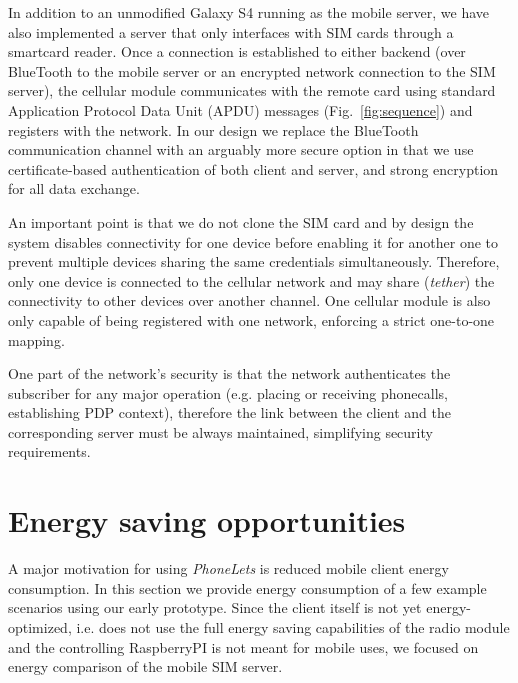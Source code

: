 \documentclass{sig-alternate-10pt}
\begin{document}
In addition to an unmodified Galaxy S4 running as the mobile server, we have also implemented a server that only interfaces with SIM cards through a smartcard reader. Once a connection is established to either backend (over BlueTooth to the mobile server or an encrypted network connection to the SIM server), the cellular module communicates with the remote card using standard Application Protocol Data Unit (APDU) messages (Fig.~\ref{fig:sequence}) and registers with the network. In our design we replace the BlueTooth communication channel with an arguably more secure option in that we use certificate-based authentication of both client and server, and strong encryption for all data exchange.

An important point is that we do not clone the SIM card and by design the system disables connectivity for one device before enabling it for another one to prevent multiple devices sharing the same credentials simultaneously. Therefore, only one device is connected to the cellular network and may share (\emph{tether}) the connectivity to other devices over another channel. One cellular module is also only capable of being registered with one network, enforcing a strict one-to-one mapping.

One part of the network's security is that the network authenticates the subscriber for any major operation (e.g. placing or receiving phonecalls, establishing PDP context), therefore the link between the client and the corresponding server must be always maintained, simplifying security requirements. 

\section{Energy saving opportunities}

A major motivation for using \emph{PhoneLets} is reduced mobile client energy consumption. In this section we provide energy consumption of a few example scenarios using our early prototype. Since the client itself is not yet energy-optimized, i.e. does not use the full energy saving capabilities of the radio module and the controlling RaspberryPI is not meant for mobile uses, we focused on energy comparison of the mobile SIM server.
\end{document}
